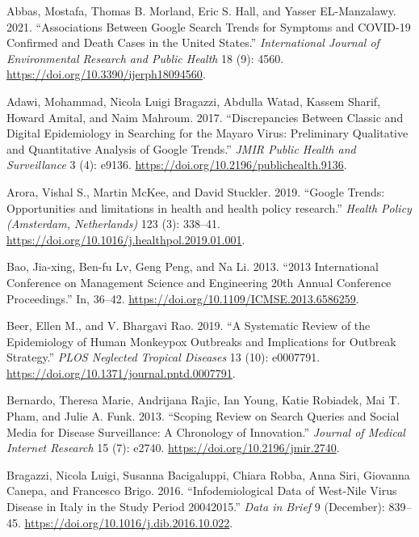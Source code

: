 \documentclass[
  12pt,
]{article}
\newlength{\cslhangindent}
\newenvironment{CSLReferences}[2] %
 {\begin{list}{}{%
  \setlength{\itemindent}{0pt}
  \setlength{\leftmargin}{0pt}
  \setlength{\parsep}{0pt}
  \ifodd #1
   \setlength{\leftmargin}{\cslhangindent}
   \setlength{\itemindent}{-1\cslhangindent}
  \fi
  \setlength{\itemsep}{#2\baselineskip}}}
 {\end{list}}
\begin{document}
\label{refs}
\begin{CSLReferences}{1}{0}
Abbas, Mostafa, Thomas B. Morland, Eric S. Hall, and Yasser
EL-Manzalawy. 2021. {``Associations Between Google Search Trends for
Symptoms and COVID-19 Confirmed and Death Cases in the United States.''}
\emph{International Journal of Environmental Research and Public Health}
18 (9): 4560. \url{https://doi.org/10.3390/ijerph18094560}.

Adawi, Mohammad, Nicola Luigi Bragazzi, Abdulla Watad, Kassem Sharif,
Howard Amital, and Naim Mahroum. 2017. {``Discrepancies Between Classic
and Digital Epidemiology in Searching for the Mayaro Virus: Preliminary
Qualitative and Quantitative Analysis of Google Trends.''} \emph{JMIR
Public Health and Surveillance} 3 (4): e9136.
\url{https://doi.org/10.2196/publichealth.9136}.

Arora, Vishal S., Martin McKee, and David Stuckler. 2019. {``Google
Trends: Opportunities and limitations in health and health policy
research.''} \emph{Health Policy (Amsterdam, Netherlands)} 123 (3):
338--41. \url{https://doi.org/10.1016/j.healthpol.2019.01.001}.

Bao, Jia-xing, Ben-fu Lv, Geng Peng, and Na Li. 2013. {``2013
International Conference on Management Science and Engineering 20th
Annual Conference Proceedings.''} In, 36--42.
\url{https://doi.org/10.1109/ICMSE.2013.6586259}.

Beer, Ellen M., and V. Bhargavi Rao. 2019. {``A Systematic Review of the
Epidemiology of Human Monkeypox Outbreaks and Implications for Outbreak
Strategy.''} \emph{PLOS Neglected Tropical Diseases} 13 (10): e0007791.
\url{https://doi.org/10.1371/journal.pntd.0007791}.

Bernardo, Theresa Marie, Andrijana Rajic, Ian Young, Katie Robiadek, Mai
T. Pham, and Julie A. Funk. 2013. {``Scoping Review on Search Queries
and Social Media for Disease Surveillance: A Chronology of
Innovation.''} \emph{Journal of Medical Internet Research} 15 (7):
e2740. \url{https://doi.org/10.2196/jmir.2740}.

Bragazzi, Nicola Luigi, Susanna Bacigaluppi, Chiara Robba, Anna Siri,
Giovanna Canepa, and Francesco Brigo. 2016. {``Infodemiological Data of
West-Nile Virus Disease in Italy in the Study Period
2004{\textendash}2015.''} \emph{Data in Brief} 9 (December): 839--45.
\url{https://doi.org/10.1016/j.dib.2016.10.022}.


\end{CSLReferences}
\end{document}

